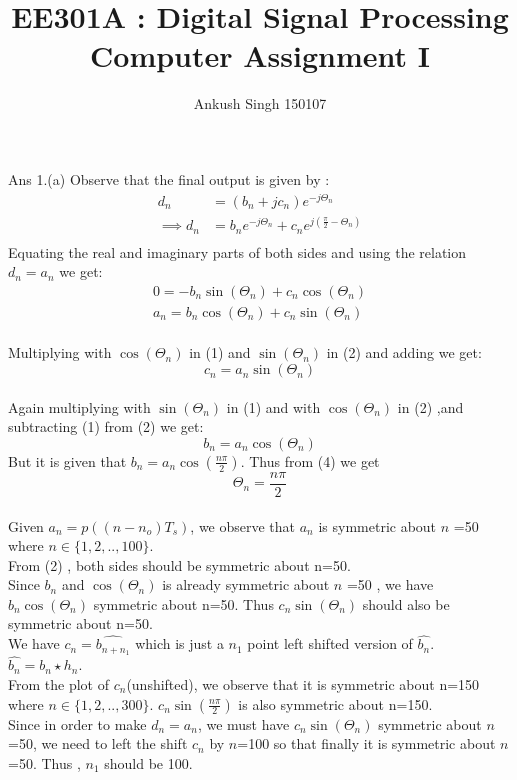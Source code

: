 \documentclass[a4paper, 20pt]{article}
\title{\textbf{ EE301A : Digital Signal Processing }\\ Computer Assignment I}
\author{Ankush Singh 150107}
\begin{document}
\maketitle
\hline\hline
\vspace{0.4pc}
Ans 1.(a) Observe that the final output is given by :
\begin{align*}
d_n&=(b_n+jc_n)e^{-j\Theta_n} \\
\implies d_n &= b_ne^{-j\Theta_n}+c_ne^{j({\frac{\pi}{2}-\Theta_n})}\\
\end{align*}
\vspace{-1pc}
Equating the real and imaginary parts of both sides and using the relation $d_n=a_n$ we get:
\begin{align}
0=-b_n\sin(\Theta_n)+c_n\cos(\Theta_n)\\
a_n=b_n\cos(\Theta_n)+c_n\sin(\Theta_n)
\end{align}\\
Multiplying with $\cos(\Theta_n)$ in (1) and $\sin(\Theta_n)$ in (2) and adding we get:
\begin{equation}
c_n=a_n\sin(\Theta_n)
\end{equation}\\
Again multiplying with $\sin(\Theta_n)$ in (1) and with $\cos(\Theta_n)$ in (2) ,and subtracting (1) from (2) we get:
\begin{equation}
b_n=a_n\cos(\Theta_n)
\end{equation}
But it is given that $b_n =a_n\cos(\frac{n\pi}{2})$. Thus from (4) we get
 \[
 \boxed{\Theta_n = \frac{n\pi}{2}}
 \]\\
 Given $a_n=p((n-n_o)T_s)$, we observe that $a_n$ is symmetric about $n$ =50 where $ n \in \{1,2,..,100\}$.\\
 From (2) , both sides should be symmetric about n=50.\\ Since $b_n$ and $\cos(\Theta_n)$ is already symmetric about $n$ =50 , we have $b_n\cos(\Theta_n)$ symmetric about n=50.
 \vspace{2pc}
Thus $c_n\sin(\Theta_n)$ should also be symmetric about n=50.\\
We have $c_n=\hat{b_{n+n_1}}$ which is just a $n_1$ point left shifted version of $\hat{b_{n}}$.\\
$\hat{b_{n}}=b_n{\star}h_n$.
\\
From the plot of $c_n$(unshifted), we observe that it is symmetric about n=150 where $ n \in \{1,2,..,300\}$. $c_n\sin(\frac{n\pi}{2})$  is also symmetric about n=150. \\Since in order to make $d_n=a_n$, we must have $c_n\sin(\Theta_n)$ symmetric about $n$=50, we need to left the shift $c_n$ by $n$=100 so that finally it is symmetric about $n$=50. Thus , $n_1$ should be 100.
\end{document}
